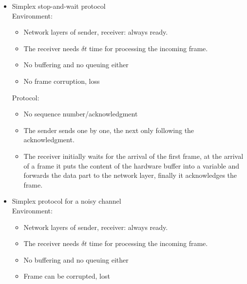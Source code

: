 \documentclass[margin=0px]{article}
\begin{document}
\begin{description}
\begin{description}
\begin{itemize}
                          Protocol:
                          \begin{itemize}
                              \item No sequence number/acknowledgment
                              \item The sender sends the frames out continuously in an infinite loop
                              \item The receiver initially waits for the arrival of the first frame, at the arrival of a frame it puts the content of the hardware buffer into a variable and forwards the data part to the network layer.
                          \end{itemize}
                    \item Simplex stop-and-wait protocol 	\\
                          Environment:
                          \begin{itemize}
                              \item Network layers of sender, receiver: always ready.
                              \item The receiver needs $\delta t$ time for processing the incoming frame.
                              \item No buffering and no queuing either
                              \item No frame corruption, loss
                          \end{itemize}

                          Protocol:
                          \begin{itemize}
                              \item No sequence number/acknowledgment
                              \item The sender sends one by one, the next only following the acknowledgment.
                              \item The receiver initially waits for the arrival of the first frame, at the arrival of a frame it puts the content of the hardware buffer into a variable and forwards the data part to the network layer, finally it acknowledges the frame.
                          \end{itemize}
                    \item Simplex protocol for a noisy channel\\
                          Environment:
                          \begin{itemize}
                              \item Network layers of sender, receiver: always ready.
                              \item The receiver needs $\delta t$ time for processing the incoming frame.
                              \item No buffering and no queuing either
                              \item Frame can be corrupted, lost
                          \end{itemize}


\end{itemize}
\end{description}
\end{description}
\end{document}
